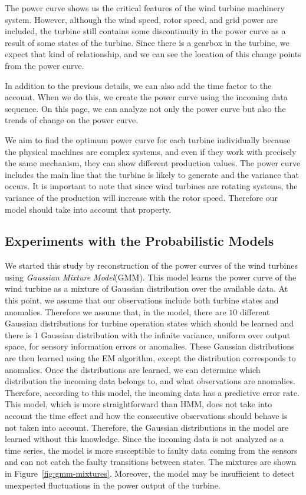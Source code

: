 The power curve shows us the critical features of the wind turbine machinery system. However, although the wind speed, rotor speed, and grid power are included, the turbine still contains some discontinuity in the power curve as a result of some states of the turbine. Since there is a gearbox in the turbine, we expect that kind of relationship, and we can see the location of this change points from the power curve.

In addition to the previous details, we can also add the time factor to the account. When we do this, we create the power curve using the incoming data sequence. On this page, we can analyze not only the power curve but also the trends of change on the power curve.

We aim to find the optimum power curve for each turbine individually because the physical machines are complex systems, and even if they work with precisely the same mechanism, they can show different production values. The power curve includes the main line that the turbine is likely to generate and the variance that occurs. It is important to note that since wind turbines are rotating systems, the variance of the production will increase with the rotor speed. Therefore our model should take into account that property.

\subsection{Experiments with the Probabilistic Models}

We started this study by reconstruction of the power curves of the wind turbines using \textit {Gaussian Mixture Model}(GMM).
This model learns the power curve of the wind turbine as a mixture of Gaussian distribution over the available data. 
At this point, we assume that our observations include both turbine states and anomalies.
Therefore we assume that, in the model, there are $10$ different Gaussian distributions for turbine operation states which should be learned and there is $1$ Gaussian distribution with the infinite variance, uniform over output space, for sensory information errors or anomalies. 
These Gaussian distributions are then learned using the EM algorithm, except the distribution corresponds to anomalies.
Once the distributions are learned, we can determine which distribution the incoming data belongs to, and what observations are anomalies.
Therefore, according to this model, the incoming data has a predictive error rate. 
This model, which is more straightforward than HMM, does not take into account the time effect and how the consecutive observations should behave is not taken into account.
Therefore, the Gaussian distributions in the model are learned without this knowledge.
Since the incoming data is not analyzed as a time series, the model is more susceptible to faulty data coming from the sensors and can not catch the faulty transitions between states. The mixtures are shown in Figure~\ref{fig:gmm-mixtures}. Moreover, the model may be insufficient to detect unexpected fluctuations in the power output of the turbine.

